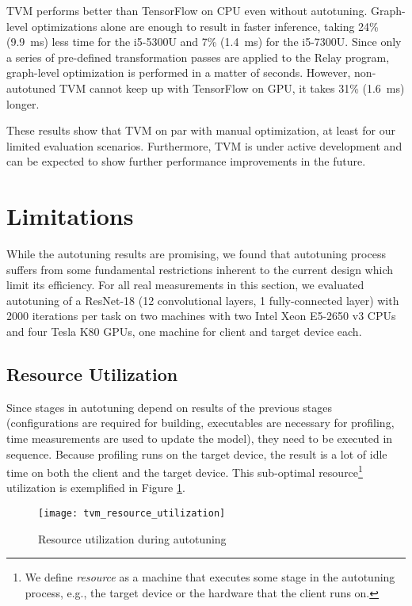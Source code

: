 TVM performs better than TensorFlow on CPU even without autotuning. Graph-level optimizations alone are enough to result in faster inference, taking 24\% (\SI{9.9}{\milli\second}) less time for the i5-5300U and 7\% (\SI{1.4}{\milli\second}) for the i5-7300U. Since only a series of pre-defined transformation passes are applied to the Relay program, graph-level optimization is performed in a matter of seconds. However, non-autotuned TVM cannot keep up with TensorFlow on GPU, it takes 31\% (\SI{1.6}{\milli\second}) longer.

These results show that TVM on par with manual optimization, at least for our limited evaluation scenarios. Furthermore, TVM is under active development and can be expected to show further performance improvements in the future.

\section{Limitations}
While the autotuning results are promising, we found that autotuning process suffers from some fundamental restrictions inherent to the current design which limit its efficiency. For all real measurements in this section, we evaluated autotuning of a ResNet-18 (12 convolutional layers, 1 fully-connected layer) with 2000 iterations per task on two machines with two Intel Xeon E5-2650 v3 CPUs and four Tesla K80 GPUs, one machine for client and target device each.

\subsection{Resource Utilization}
Since stages in autotuning depend on results of the previous stages (configurations are required for building, executables are necessary for profiling, time measurements are used to update the model), they need to be executed in sequence. Because profiling runs on the target device, the result is a lot of idle time on both the client and the target device. This sub-optimal resource\footnote{We define \textit{resource} as a machine that executes some stage in the autotuning process, e.g., the target device or the hardware that the client runs on.} utilization is exemplified in Figure \ref{fig:tvm-res-util}.

\begin{figure}
	\centering
	\texttt{[image: tvm\_resource\_utilization]}%
	\caption{Resource utilization during autotuning}
	\label{fig:tvm-res-util}
\end{figure}

